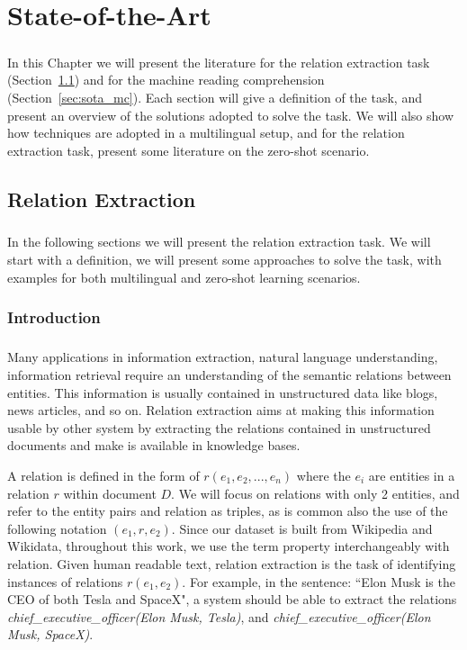 \chapter{State-of-the-Art} %
\label{chpt:3}
\paragraph{}
In this Chapter we will present the literature for the relation extraction task (Section~\ref{sec:sota_re}) and for the machine reading comprehension (Section~\ref{sec:sota_mc}). Each section will give a definition of the task, and present an overview of the solutions adopted to solve the task. We will also show how techniques are adopted in a multilingual setup, and for the relation extraction task, present some literature on the zero-shot scenario.   


\section{Relation Extraction}
\label{sec:sota_re}
\paragraph{}
In the following sections we will present the relation extraction task. We will start with a definition, we will present some approaches to solve the task, with examples for both multilingual and zero-shot learning scenarios.

\subsection{Introduction}
\paragraph{}
Many applications in information extraction, natural language understanding, information retrieval require an understanding of the semantic relations between entities. This information is usually contained in unstructured data like blogs, news articles, and so on.  Relation extraction aims at making this information usable by other system by extracting the relations contained in unstructured documents and make is available in knowledge bases.

A relation is defined in the form of $r(e_1, e_2, ..., e_n)$ where the $e_i$ are entities in a relation $r$ within document $D$. We will focus on relations with only 2 entities, and refer to the entity pairs and relation as triples, as is common also the use of the following notation $(e_1, r, e_2)$. Since our dataset is built from Wikipedia and Wikidata, throughout this work, we use the term property interchangeably with relation. Given human readable text, relation extraction is the task of identifying instances of relations $r(e_1,e_2)$. For example, in the sentence: ``Elon Musk is the CEO of both Tesla and SpaceX", a system should be able to extract the relations \textit{chief\_executive\_officer({Elon Musk}, Tesla)}, and \textit{chief\_executive\_officer(Elon Musk, SpaceX)}. 

